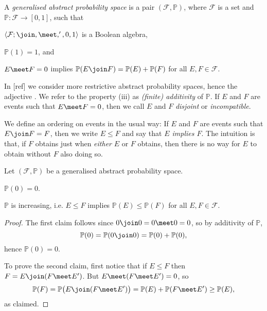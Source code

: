 \documentclass[article, a4paper, 11pt, oneside]{memoir}
\numberwithin{equation}{chapter}
\newcommand{\calF}{\mathcal{F}}
\renewcommand{\P}{\mathbb{P}}
\begin{document}
\begin{definition}
    A \emph{generalised abstract probability space} is a pair $(\calF, \P)$, where $\calF$ is a set and $\P \colon \calF \to [0,1]$, such that
    \begin{enumdef}
        \item $\langle \calF; \join, \meet, ', 0, 1 \rangle$ is a Boolean algebra,
        \item $\P(1) = 1$, and
        \item $E \meet F = 0$ implies $\P(E \join F) = \P(E) + \P(F)$ for all $E,F \in \calF$.
    \end{enumdef}
\end{definition}
%
In [ref] we consider more restrictive abstract probability spaces, hence the adjective . We refer to the property (iii) as \emph{(finite) additivity} of $\P$. If $E$ and $F$ are events such that $E \meet F = 0$, then we call $E$ and $F$ \emph{disjoint} or \emph{incompatible}.

We define an ordering on events in the usual way: If $E$ and $F$ are events such that $E \join F = F$, then we write $E \leq F$ and say that \emph{$E$ implies $F$}. The intuition is that, if $F$ obtains just when \emph{either} $E$ or $F$ obtains, then there is no way for $E$ to obtain without $F$ also doing so.


\begin{lemma}
    Let $(\calF, \P)$ be a generalised abstract probability space.
    \begin{enumlem}
        \item $\P(0) = 0$.
        \item $\P$ is increasing, i.e. $E \leq F$ implies $\P(E) \leq \P(F)$ for all $E,F \in \calF$.
    \end{enumlem}
\end{lemma}

\begin{proof}
    The first claim follows since $0 \join 0 = 0 \meet 0 = 0$, so by additivity of $\P$,
    \begin{equation*}
        \P(0)
            = \P(0 \join 0)
            = \P(0) + \P(0),
    \end{equation*}
    hence $\P(0) = 0$.

    To prove the second claim, first notice that if $E \leq F$ then $F = E \join (F \meet E')$. But $E \meet (F \meet E') = 0$, so
    \begin{equation*}
        \P(F)
            = \P \bigl( E \join (F \meet E') \bigr)
            = \P(E) + \P(F \meet E')
            \geq \P(E),
    \end{equation*}
    as claimed.
\end{proof}
\end{document}
